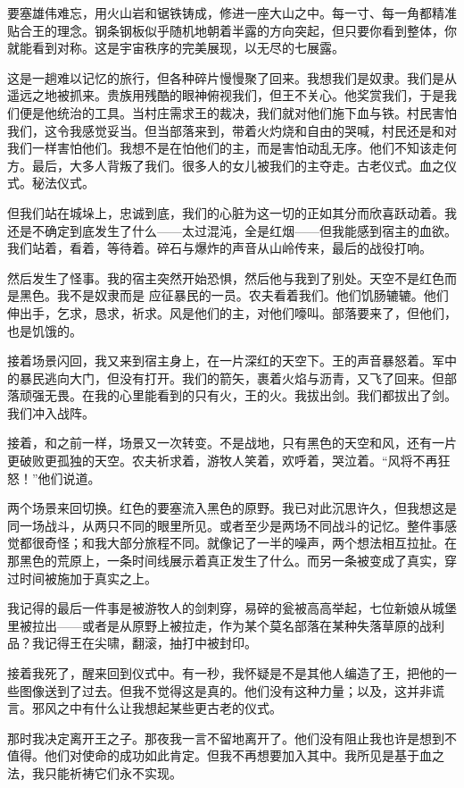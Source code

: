 \begin{scpbox}

要塞雄伟难忘，用火山岩和锯铁铸成，修进一座大山之中。每一寸、每一角都精准贴合王的理念。钢条钢板似乎随机地朝着半露的方向突起，但只要你看到整体，你就能看到对称。这是宇宙秩序的完美展现，以无尽的七展露。

这是一趟难以记忆的旅行，但各种碎片慢慢聚了回来。我想我们是奴隶。我们是从遥远之地被抓来。贵族用残酷的眼神俯视我们，但王不关心。他奖赏我们，于是我们便是他统治的工具。当村庄需求王的裁决，我们就对他们施下血与铁。村民害怕我们，这令我感觉妥当。但当部落来到，带着火灼烧和自由的哭喊，村民还是和对我们一样害怕他们。我想不是在怕他们的主，而是害怕动乱无序。他们不知该走何方。最后，大多人背叛了我们。很多人的女儿被我们的主夺走。古老仪式。血之仪式。秘法仪式。

但我们站在城垛上，忠诚到底，我们的心脏为这一切的正如其分而欣喜跃动着。我还是不确定到底发生了什么——太过混沌，全是红烟——但我能感到宿主的血欲。我们站着，看着，等待着。碎石与爆炸的声音从山岭传来，最后的战役打响。

然后发生了怪事。我的宿主突然开始恐惧，然后他与我到了别处。天空不是红色而是黑色。我不是奴隶而是 应征暴民的一员。农夫看着我们。他们饥肠辘辘。他们伸出手，乞求，恳求，祈求。风是他们的主，对他们嚎叫。部落要来了，但他们，也是饥饿的。

接着场景闪回，我又来到宿主身上，在一片深红的天空下。王的声音暴怒着。军中的暴民逃向大门，但没有打开。我们的箭矢，裹着火焰与沥青，又飞了回来。但部落顽强无畏。在我的心里能看到的只有火，王的火。我拔出剑。我们都拔出了剑。我们冲入战阵。

接着，和之前一样，场景又一次转变。不是战地，只有黑色的天空和风，还有一片更破败更孤独的天空。农夫祈求着，游牧人笑着，欢呼着，哭泣着。“风将不再狂怒！”他们说道。

两个场景来回切换。红色的要塞流入黑色的原野。我已对此沉思许久，但我想这是同一场战斗，从两只不同的眼里所见。或者至少是两场不同战斗的记忆。整件事感觉都很奇怪；和我大部分旅程不同。就像记了一半的噪声，两个想法相互拉扯。在那黑色的荒原上，一条时间线展示着真正发生了什么。而另一条被变成了真实，穿过时间被施加于真实之上。

我记得的最后一件事是被游牧人的剑刺穿，易碎的瓮被高高举起，七位新娘从城堡里被拉出——或者是从原野上被拉走，作为某个莫名部落在某种失落草原的战利品？我记得王在尖啸，翻滚，抽打中被封印。

接着我死了，醒来回到仪式中。有一秒，我怀疑是不是其他人编造了王，把他的一些图像送到了过去。但我不觉得这是真的。他们没有这种力量；以及，这并非谎言。邪风之中有什么让我想起某些更古老的仪式。

那时我决定离开王之子。那夜我一言不留地离开了。他们没有阻止我也许是想到不值得。他们对使命的成功如此肯定。但我不再想要加入其中。我所见是基于血之法，我只能祈祷它们永不实现。

\end{scpbox}

